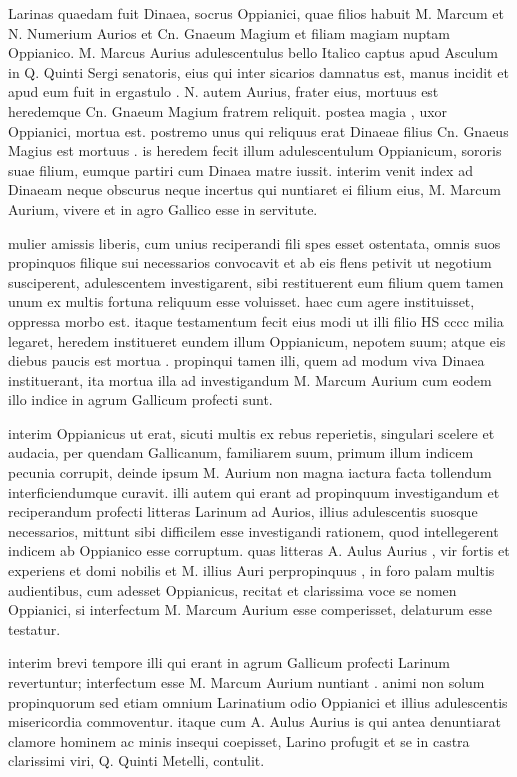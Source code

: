  Larinas quaedam fuit Dinaea, socrus Oppianici, quae filios habuit M. Marcum et N. Numerium Aurios et Cn. Gnaeum Magium et filiam magiam nuptam Oppianico. M. Marcus Aurius adulescentulus bello Italico captus apud Asculum in Q. Quinti Sergi senatoris, eius qui inter sicarios damnatus est, manus incidit et apud eum fuit in ergastulo . N. autem Aurius, frater eius, mortuus est heredemque Cn. Gnaeum Magium fratrem reliquit. postea magia , uxor Oppianici, mortua est. postremo unus qui reliquus erat Dinaeae filius Cn. Gnaeus Magius est mortuus . is heredem fecit illum adulescentulum Oppianicum, sororis suae filium, eumque partiri cum Dinaea matre iussit. interim venit index ad Dinaeam neque obscurus neque incertus qui nuntiaret ei filium eius, M. Marcum Aurium, vivere et in agro Gallico esse in servitute.

 mulier amissis liberis, cum unius reciperandi fili spes esset ostentata, omnis suos propinquos filique sui necessarios convocavit et ab eis flens petivit ut negotium susciperent, adulescentem investigarent, sibi restituerent eum filium quem tamen unum ex multis fortuna reliquum esse voluisset. haec cum agere instituisset, oppressa morbo est. itaque testamentum fecit eius modi ut illi filio HS cccc milia legaret, heredem institueret eundem illum Oppianicum, nepotem suum; atque eis diebus paucis est mortua . propinqui tamen illi, quem ad modum viva Dinaea instituerant, ita mortua illa ad investigandum M. Marcum Aurium cum eodem illo indice in agrum Gallicum profecti sunt.

 interim Oppianicus ut erat, sicuti multis ex rebus reperietis, singulari scelere et audacia, per quendam Gallicanum, familiarem suum, primum illum indicem pecunia corrupit, deinde ipsum M. Aurium non magna iactura facta tollendum interficiendumque curavit. illi autem qui erant ad propinquum investigandum et reciperandum profecti litteras Larinum ad Aurios, illius adulescentis suosque necessarios, mittunt sibi difficilem esse investigandi rationem, quod intellegerent indicem ab Oppianico esse corruptum. quas litteras A. Aulus Aurius , vir fortis et experiens et domi nobilis et M. illius Auri perpropinquus , in foro palam multis audientibus, cum adesset Oppianicus, recitat et clarissima voce se nomen Oppianici, si interfectum M. Marcum Aurium esse comperisset, delaturum esse testatur.

 interim brevi tempore illi qui erant in agrum Gallicum profecti Larinum revertuntur; interfectum esse M. Marcum Aurium nuntiant . animi non solum propinquorum sed etiam omnium Larinatium odio Oppianici et illius adulescentis misericordia commoventur. itaque cum A. Aulus Aurius is qui antea denuntiarat clamore hominem ac minis insequi coepisset, Larino profugit et se in castra clarissimi viri, Q. Quinti Metelli, contulit.


